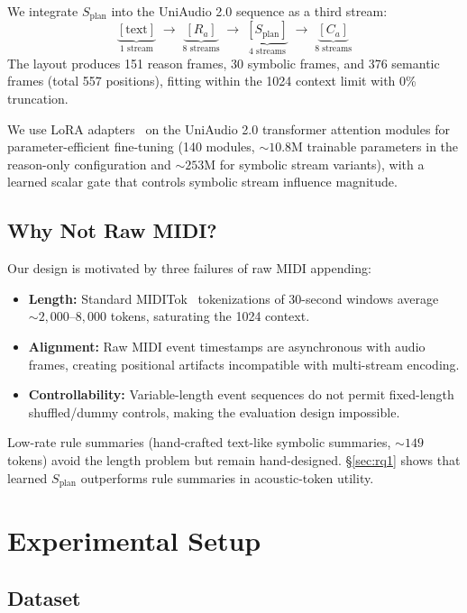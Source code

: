 \documentclass[11pt]{article}
\newcommand{\splan}{$S_{\mathrm{plan}}$}
\newcommand{\splanmath}{S_{\mathrm{plan}}}
\newcommand{\Ramath}{R_a}
\newcommand{\Camath}{C_a}
\begin{document}
We integrate \splan{} into the UniAudio 2.0 sequence as a third stream:
\[
\underbrace{[\mathrm{text}]}_{\text{1 stream}} \;\to\;
\underbrace{[\Ramath]}_{\text{8 streams}} \;\to\;
\underbrace{[\splanmath]}_{\text{4 streams}} \;\to\;
\underbrace{[\Camath]}_{\text{8 streams}}
\]
The layout produces 151 reason frames, 30 symbolic frames, and 376 semantic frames
(total 557 positions), fitting within the 1024 context limit with 0\% truncation.

We use LoRA adapters~\citep{hu2022lora} on the UniAudio 2.0 transformer attention
modules for parameter-efficient fine-tuning (140 modules, ${\sim}10.8$M trainable
parameters in the reason-only configuration and ${\sim}253$M for symbolic stream
variants), with a learned scalar gate that controls symbolic stream influence magnitude.

\subsection{Why Not Raw MIDI?}

Our design is motivated by three failures of raw MIDI appending:
\begin{itemize}
  \item \textbf{Length:} Standard MIDITok~\citep{fradet2021miditok} tokenizations
    of 30-second windows average ${\sim}2{,}000$--$8{,}000$ tokens, saturating the
    1024 context.
  \item \textbf{Alignment:} Raw MIDI event timestamps are asynchronous with audio
    frames, creating positional artifacts incompatible with multi-stream encoding.
  \item \textbf{Controllability:} Variable-length event sequences do not permit
    fixed-length shuffled/dummy controls, making the evaluation design impossible.
\end{itemize}

Low-rate rule summaries (hand-crafted text-like symbolic summaries, ${\sim}149$ tokens)
avoid the length problem but remain hand-designed.  \S\ref{sec:rq1} shows that learned
\splan{} outperforms rule summaries in acoustic-token utility.

\section{Experimental Setup}

\subsection{Dataset}
\label{sec:dataset}
\end{document}

